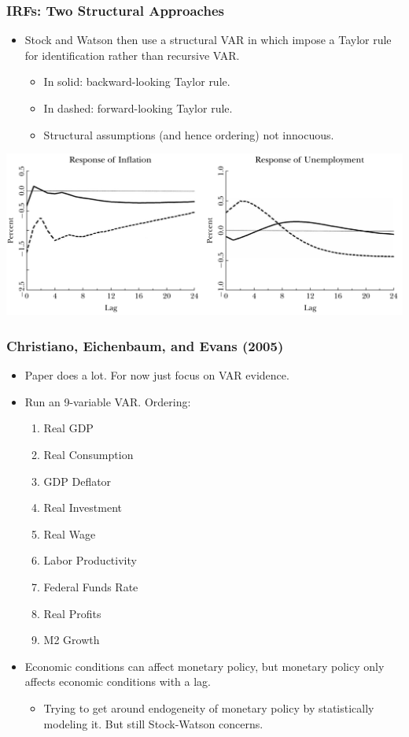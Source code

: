 \documentclass[english,xcolor=svgnames]{beamer}
\begin{document}
\begin{frame}
\frametitle{IRFs: Two Structural Approaches
}
\begin{itemize}
	\item Stock and Watson then use a structural VAR in which impose a Taylor rule for identification rather than recursive VAR.
	\begin{itemize}
		\item In solid: backward-looking Taylor rule.
		\item In dashed: forward-looking Taylor rule.
		\item Structural assumptions (and hence ordering) not innocuous.
	\end{itemize}
\end{itemize}
\centering
\includegraphics[scale=0.4]{../../Images/stockwatson2001structural.png}
\end{frame}

\begin{frame}
\frametitle{Christiano, Eichenbaum, and Evans (2005)}
\begin{itemize}
	\item Paper does a lot. For now just focus on VAR evidence.
	\item Run an 9-variable VAR. Ordering:
	\begin{enumerate}[1.]
		\item Real GDP
		\item Real Consumption
		\item GDP Deflator
		\item Real Investment
		\item Real Wage
		\item Labor Productivity
		\item Federal Funds Rate
		\item Real Profits
		\item M2 Growth
	\end{enumerate}
	\item Economic conditions can affect monetary policy, but monetary policy only affects economic conditions with a lag.
	\begin{itemize}
		\item Trying to get around endogeneity of monetary policy by statistically modeling it. But still Stock-Watson concerns.
	\end{itemize}
\end{itemize}
\end{frame}
\end{document}
